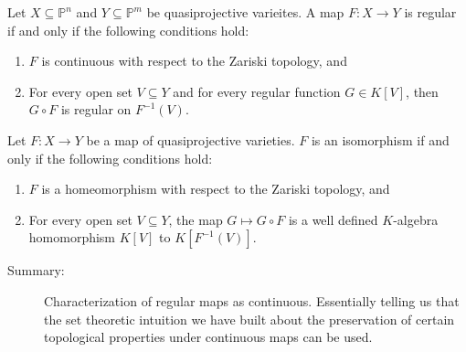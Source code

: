 \documentclass[40pt]{article}
\newcommand{\Proj}{\mathbb{P}}
\theoremstyle{remark}
\begin{document}
			\begin{prop}
				Let $X\subseteq \Proj^n$ and $Y \subseteq \Proj^m$ be quasiprojective varieites. A map $F:X\to Y$ is regular if and only if the following conditions hold:
				\begin{enumerate}
					\item $F$ is continuous with respect to the Zariski topology, and
					\item For every open set $V \subseteq Y$ and for every regular function $G \in K[V]$, then $G \circ F$ is regular on $F^{-1}(V)$. 
				\end{enumerate}
			\end{prop}
			\begin{prop}
				Let $F : X\to Y$ be a map of quasiprojective varieties. $F$ is an isomorphism if and only if the following conditions hold:
				\begin{enumerate}
					\item $F$ is a homeomorphism with respect to the Zariski topology, and 
					\item For every open set $V \subseteq Y$, the map $G \mapsto G \circ F$ is a well defined $K$-algebra homomorphism $K[V]$ to $K[F^{-1}(V)]$. 
				\end{enumerate}
			\end{prop}
			\begin{description}
				\item[Summary:] Characterization of regular maps as continuous. Essentially telling us that the set theoretic intuition we have built about the preservation of certain topological properties under continuous maps can be used. 
			\end{description}
\end{document}
